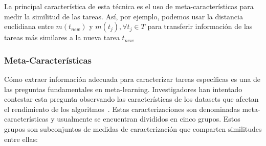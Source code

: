 La principal característica de esta técnica es el uso de meta-características para medir la similitud de las tareas. Así, por ejemplo, podemos usar la distancia euclidiana entre $m(t_{new})$ y $m(t_j), \forall t_j \in T$ para transferir información de las tareas más similares a la nueva tarea $t_{new}$


\subsubsection{Meta-Características}


Cómo extraer información adecuada para caracterizar tareas específicas es una de las preguntas fundamentales en meta-learning. Investigadores han intentado contestar esta pregunta observando las características de los datasets que afectan el rendimiento de los algoritmos~\cite{Rivolli2018TowardsRE}. Estas caracterizaciones son denominadas meta-características y usualmente se encuentran divididos en cinco grupos. Estos grupos son subconjuntos de medidas de caracterización \cite{bradzil2009metalearning} que comparten similitudes entre ellas:


